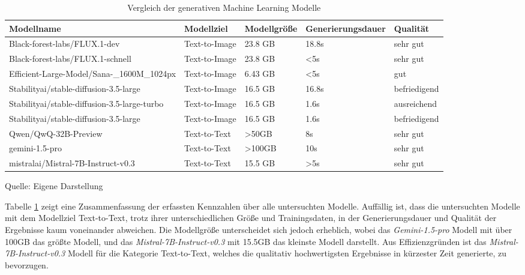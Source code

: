 \begin{table}[h]
  \begin{tabular}{|p{3cm}|p{3cm}|p{2cm}|p{2cm}|p{3cm}|}
      \hline
      \textbf{Modellname} & \textbf{Modellziel} & \textbf{Modellgröße} & \textbf{Generierungsdauer} & \textbf{Qualität}\\ \hline
      {Black-forest-labs/FLUX.1-dev} & Text-to-Image & 23.8 GB & 18.8s & sehr gut\\ \hline
      {Black-forest-labs/FLUX.1-schnell} & Text-to-Image & 23.8 GB & \textless 5s & sehr gut\\ \hline
      {Efficient-Large-Model/Sana-\_1600M\_1024px} & Text-to-Image & 6.43 GB & \textless 5s & gut\\ \hline
      {Stabilityai/stable-diffusion-3.5-large} & Text-to-Image & 16.5 GB & 16.8s & befriedigend\\ \hline
      {Stabilityai/stable-diffusion-3.5-large-turbo} & Text-to-Image & 16.5 GB & 1.6s & ausreichend\\ \hline
      {Stabilityai/stable-diffusion-3.5-large} & Text-to-Image & 16.5 GB & 1.6s& befriedigend\\ \hline
      {Qwen/QwQ-32B-Preview} & Text-to-Text & \textgreater 50GB & 8s & sehr gut\\ \hline
      {gemini-1.5-pro} & Text-to-Text & \textgreater 100GB & 10s & sehr gut\\ \hline
      {mistralai/Mistral-7B-Instruct-v0.3} & Text-to-Text & 15.5 GB & \textgreater5s & sehr gut\\ \hline
  \end{tabular}
  \caption{Vergleich der generativen Machine Learning Modelle}\label{tab:table_modellvergleich}
  \vspace{0.5cm}
  \raggedright Quelle: Eigene Darstellung
\end{table}

Tabelle \ref{tab:table_modellvergleich} zeigt eine Zusammenfassung der erfassten Kennzahlen über alle untersuchten Modelle.
Auffällig ist, dass die untersuchten Modelle mit dem Modellziel Text-to-Text, trotz ihrer unterschiedlichen Größe und Trainingsdaten, in der Generierungsdauer und Qualität der Ergebnisse kaum voneinander abweichen.
Die Modellgröße unterscheidet sich jedoch erheblich, wobei das \textit{Gemini-1.5-pro} Modell mit über 100GB das größte Modell, und das \textit{Mistral-7B-Instruct-v0.3} mit 15.5GB das kleinste Modell darstellt.
Aus Effizienzgründen ist das \textit{Mistral-7B-Instruct-v0.3} Modell für die Kategorie Text-to-Text, welches die qualitativ hochwertigsten Ergebnisse in kürzester Zeit generierte, zu bevorzugen.

